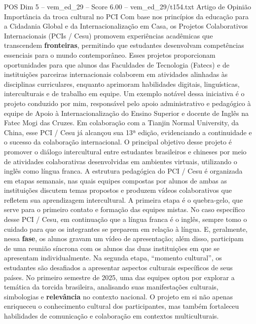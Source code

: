 \begin{textsample}{POS Dim 5 – vem\_ed\_29 – Score 6.00 – vem\_ed\_29/t154.txt}  \label{ex:f5_pos_044}
Artigo de Opinião Importância da troca cultural no PCI Com base nos princípios da educação para a Cidadania Global e da Internacionalização em Casa, os Projetos Colaborativos Internacionais (PCIs / Cesu) promovem experiências acadêmicas que transcendem \textbf{fronteiras}, permitindo que estudantes desenvolvam competências essenciais para o mundo contemporâneo.
Esses projetos proporcionam oportunidades para que alunos das Faculdades de Tecnologia (Fatecs) e de instituições parceiras internacionais colaborem em atividades alinhadas às disciplinas curriculares, enquanto aprimoram habilidades digitais, linguísticas, interculturais e de trabalho em equipe.
Um exemplo notável dessa iniciativa é o projeto conduzido por mim, responsável pelo apoio administrativo e pedagógico à equipe de Apoio à Internacionalização do Ensino Superior e docente de Inglês na Fatec Mogi das Cruzes.
Em colaboração com a Tianjin Normal University, da China, esse PCI / Cesu já alcançou sua 13ª edição, evidenciando a continuidade e o sucesso da colaboração internacional.
O principal objetivo desse projeto é promover o diálogo intercultural entre estudantes brasileiros e chineses por meio de atividades colaborativas desenvolvidas em ambientes virtuais, utilizando o inglês como língua franca.
A estrutura pedagógica do PCI / Cesu é organizada em etapas semanais, nas quais equipes compostas por alunos de ambas as instituições discutem temas propostos e produzem vídeos colaborativos que refletem sua aprendizagem intercultural.
A primeira etapa é o quebra-gelo, que serve para o primeiro contato e formação das equipes mistas.
No caso específico desse PCI / Cesu, em continuação que a língua franca é o inglês, sempre tomo o cuidado para que os integrantes se preparem em relação à língua.
E, geralmente, nessa \textbf{fase}, os alunos gravam um vídeo de apresentação; além disso, participam de uma reunião síncrona com os alunos das duas instituições em que se apresentam individualmente.
Na segunda etapa, “momento cultural”, os estudantes são desafiados a apresentar aspectos culturais específicos de seus países.
No primeiro semestre de 2025, uma das equipes optou por explorar a temática da torcida brasileira, analisando suas manifestações culturais, simbologias e \textbf{relevância} no contexto nacional.
O projeto em si não apenas enriqueceu o conhecimento cultural dos participantes, mas também fortaleceu habilidades de comunicação e colaboração em contextos multiculturais.

\end{textsample}
